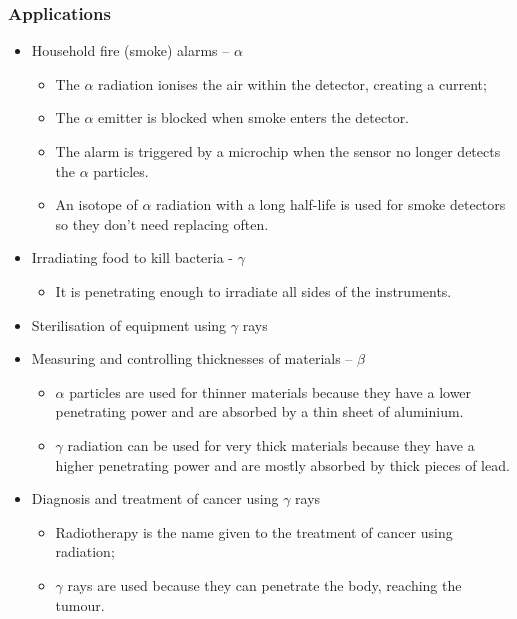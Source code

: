 \documentclass[a4paper,12pt]{article}
\begin{document}
\subsubsection{Applications}
\begin{itemize}
    \item Household fire (smoke) alarms -- \(\alpha\)
    \begin{itemize}
        \item The \(\alpha\) radiation ionises the air within the detector, creating a current;
        \item The \(\alpha\) emitter is blocked when smoke enters the detector.
        \item The alarm is triggered by a microchip when the sensor no longer detects the \(\alpha\) particles.
        \item An isotope of \(\alpha\) radiation with a long half-life is used for smoke detectors so they don't need replacing often.
    \end{itemize}
    \item Irradiating food to kill bacteria - \(\gamma\)
    \begin{itemize}
        \item It is penetrating enough to irradiate all sides of the instruments.
    \end{itemize}
    \item Sterilisation of equipment using \(\gamma\) rays
    \item Measuring and controlling thicknesses of materials -- \(\beta\)
    \begin{itemize}
        \item \(\alpha\) particles are used for thinner materials because they have a lower penetrating power and are absorbed by a thin sheet of aluminium.
        \item \(\gamma\) radiation can be used for very thick materials because they have a higher penetrating power and are mostly absorbed by thick pieces of lead.
    \end{itemize}
    \item Diagnosis and treatment of cancer using \(\gamma\) rays
    \begin{itemize}
        \item Radiotherapy is the name given to the treatment of cancer using radiation;
        \item \(\gamma\) rays are used because they can penetrate the body, reaching the tumour.
    \end{itemize}
\end{itemize}
\end{document}
